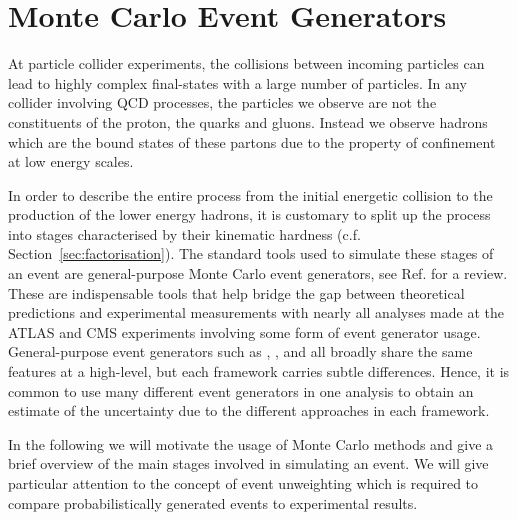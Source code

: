 \documentclass[main.tex]{subfiles}
\begin{document}
\chapter{Monte Carlo Event Generators}\label{chapter:MC}
    At particle collider experiments,
    the collisions between incoming particles can lead
    to highly complex final-states with a large number
    of particles. In any collider involving QCD processes,
    the particles we observe are not the constituents
    of the proton, the quarks and gluons. Instead we observe
    hadrons which are the bound states of these partons
    due to the property of confinement at low energy scales.

    In order to describe the entire process
    from the initial energetic collision to the production
    of the lower energy hadrons, it is customary to
    split up the process into stages characterised by
    their kinematic hardness (c.f. Section~\ref{sec:factorisation}).
    The standard tools used
    to simulate these stages of an event are general-purpose
    Monte Carlo event generators, see
    Ref. \cite{Buckley:2011ms} for a review.
    These are indispensable tools that help
    bridge the gap between theoretical predictions
    and experimental measurements with nearly all
    analyses made at the ATLAS and CMS experiments
    involving some form of event generator usage.
    General-purpose event generators
    such as {\Herwig} \cite{Bahr:2008pv,Bellm:2015jjp},
    {\Pythia} \cite{Sjostrand:2006za,Bierlich:2022pfr},
    and {\Sherpa} \cite{Gleisberg:2008ta,Sherpa:2019gpd} all broadly share 
    the same features at a high-level, but each framework
    carries subtle differences. Hence, it is common
    to use many different event generators
    in one analysis to obtain an estimate of the uncertainty
    due to the different approaches in each framework.

    In the following we will motivate the usage of
    Monte Carlo methods and give a brief overview
    of the main stages involved in simulating an event.
    We will give particular attention to the concept of event
    unweighting which is required to compare probabilistically
    generated events to experimental results.
\end{document}
